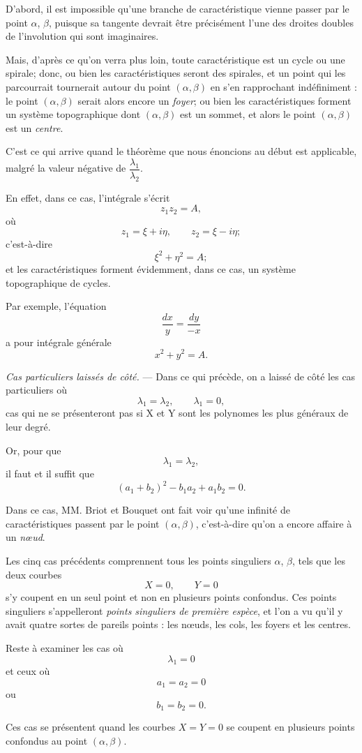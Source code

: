 \documentclass[11pt]{article}
\begin{document}
D’abord, il est impossible qu’une branche de caractéristique vienne passer par le point $\alpha$, $\beta$, puisque sa tangente devrait être précisément l’une des droites doubles de l’involution qui sont imaginaires.

Mais, d’après ce qu’on verra plus loin, toute caractéristique est un cycle ou une spirale; donc, ou bien les caractéristiques seront des spirales, et un point qui les parcourrait tournerait autour du point $(\alpha,\beta)$ en s’en rapprochant indéfiniment : le point $(\alpha,\beta)$ serait alors encore un \emph{foyer}; ou bien les caractéristiques forment un système topographique dont $(\alpha,\beta)$ est un sommet, et alors le point $(\alpha,\beta)$ est un \emph{centre}.

C’est ce qui arrive quand le théorème que nous énoncions au début est applicable, malgré la valeur négative de $\dfrac{\lambda_1}{\lambda_2}$.

En effet, dans ce cas, l’intégrale s’écrit
\[
z_1z_2=A,
\]
où
\[
z_1=\xi+i\eta,
\qquad
z_2=\xi-i\eta;
\]
c’est-à-dire
\[
\xi^2+\eta^2=A;
\]
et les caractéristiques forment évidemment, dans ce cas, un système topographique de cycles.

Par exemple, l’équation
\[
\frac{dx}{y}=\frac{dy}{-x}
\]
a pour intégrale générale
\[
x^2+y^2=A.
\]

\emph{Cas particuliers laissés de côté.} --- Dans ce qui précède, on a laissé de côté les cas particuliers où
\[
\lambda_1=\lambda_2,
\qquad
\lambda_1=0,
\]
cas qui ne se présenteront pas si X et Y sont les polynomes les plus généraux de leur degré.

Or, pour que
\[
\lambda_1=\lambda_2,
\]
il faut et il suffit que
\[
(a_1+b_2)^2-b_1a_2+a_1b_2=0.
\]

Dans ce cas, MM. Briot et Bouquet ont fait voir qu’une infinité de caractéristiques passent par le point $(\alpha,\beta)$, c’est-à-dire qu’on a encore affaire à un \emph{nœud}.

Les cinq cas précédents comprennent tous les points singuliers $\alpha$, $\beta$, tels que les deux courbes
\[
X=0,\qquad Y=0
\]
s’y coupent en un seul point et non en plusieurs points confondus. Ces points singuliers s’appelleront \emph{points singuliers de première espèce}, et l’on a vu qu’il y avait quatre sortes de pareils points : les nœuds, les cols, les foyers et les centres.

Reste à examiner les cas où
\[
\lambda_1=0
\]
et ceux où
\[
a_1=a_2=0
\]
ou
\[
b_1=b_2=0.
\]

Ces cas se présentent quand les courbes $X=Y=0$ se coupent en plusieurs points confondus au point $(\alpha,\beta)$.
\end{document}
